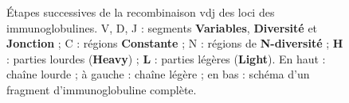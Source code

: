 \begin{figure}[H]
\begin{tikzpicture}[
        node distance=0.3cm and 0cm,
        >=Stealth,
        thick,
        font=\small,
        scale=0.95,
        every node/.style={scale=0.95}
        ]
    \end{tikzpicture}
    \caption{
        Étapes successives de la recombinaison \gls{vdj} des loci des immunoglobulines. 
        \colorbox{blue!20}{V}, \colorbox{green!30}{D}, \colorbox{orange!30}{J} : segments \textbf{Variables}, \textbf{Diversité} et \textbf{Jonction} ; 
        \colorbox{gray!30}{C} : régions \textbf{Constante} ; 
        \colorbox{red!20}{N} : régions de \textbf{N-diversité} ; 
        \textbf{H} : parties lourdes (\textbf{Heavy}) ; 
        \textbf{L} : parties légères (\textbf{Light}). 
        En haut : chaîne lourde ; à gauche : chaîne légère ; 
        en bas : schéma d'un fragment d'immunoglobuline complète.
    }    
    \label{fig:vdj}
\end{figure}
